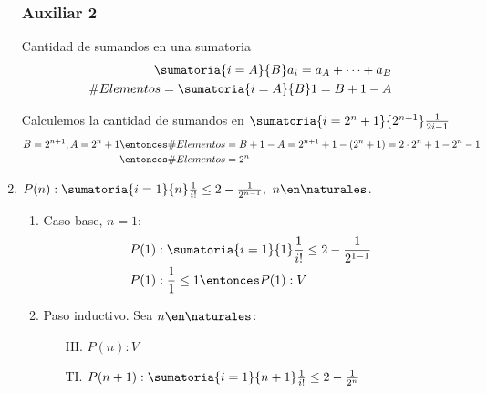 \begin{enumerate}[label=\roman*)]
        \subsubsection*{Auxiliar 2}

        Cantidad de sumandos en una sumatoria
        \begin{align*}
          \sumatoria{i=A}{B}a_i = a_A + \dots + a_B \\
          \# Elementos = \sumatoria{i=A}{B}1 = B + 1 - A
        \end{align*}

        Calculemos la cantidad de sumandos en $ \sumatoria{i=2^n + 1}{2^{n+1}} \frac{1}{2i-1}$
        \begin{align*}
          B = 2^{n+1}, A = 2^n + 1 \entonces & \# Elementos = B + 1 - A = 2^{n+1} + 1  - (2^n + 1)
          = 2 \cdot 2^n + 1 - 2^n -1                                                               \\
          \entonces                          & \# Elementos = 2^n
        \end{align*}

  \item $P(n): \sumatoria{i=1}{n} \frac{1}{i!} \leq 2 - \frac{1}{2^{n-1}}, \ n \en \naturales$.
        \begin{enumerate}[label=\arabic*)]
          \item Caso base, $n = 1$:
                \begin{align*}
                  P(1) & : \sumatoria{i=1}{1} \frac{1}{i!} \leq 2 - \frac{1}{2^{1-1}} \\
                  P(1) & : \frac{1}{1} \leq 1 \entonces P(1):V
                \end{align*}
          \item Paso inductivo. Sea $n \en \naturales$:
                \begin{enumerate}
                  \item[HI.] $P(n): V$
                  \item[TI.] $P(n+1):  \sumatoria{i=1}{n+1} \frac{1}{i!} \leq 2 - \frac{1}{2^{n}}$
                \end{enumerate}


\end{enumerate}
\end{enumerate}
